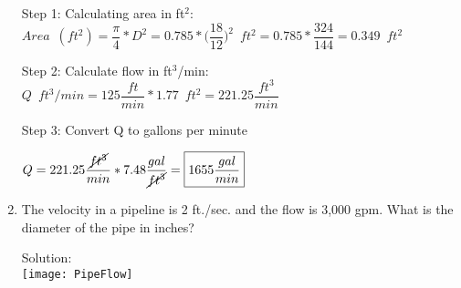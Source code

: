\begin{enumerate}
\vspace{0.2cm}
Step 1:  Calculating area in ft${^2}$:\\
\vspace{0.2cm}
$Area \enspace (ft^2)= \dfrac{\pi}{4}*D^2= 0.785*\Big(\dfrac{18}{12}\Big)^2 \enspace ft^2=0.785*\dfrac{324}{144}=0.349 \enspace ft^2$\\
\vspace{0.2cm}

Step 2: Calculate flow in ft$^3$/min:\\

$ Q \enspace ft^3/min = 125 \dfrac{ft}{min}*1.77 \enspace ft^2 = 221.25 \dfrac{ft^3}{min}$\\

\vspace{0.2cm}

Step 3: Convert Q to gallons per minute

\vspace{0.2cm}

$Q=221.25 \dfrac{\cancel{ft^3}}{min}*7.48\dfrac{gal}{\cancel{ft^3}}=\boxed{1655 \dfrac{gal}{min}}$


\item The velocity in a pipeline is 2 ft./sec. and the flow is 3,000 gpm. What is the diameter of the pipe in inches?

Solution:\\
\vspace{0.3cm}
\texttt{[image: PipeFlow]}\\
\vspace{0.3cm}


\end{enumerate}
